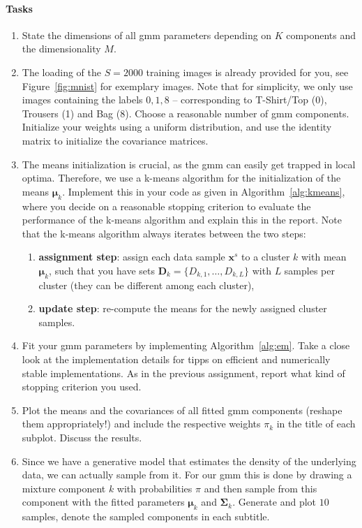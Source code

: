 \documentclass{article}
\newcommand{\sig}{\boldsymbol{\Sigma}}
\newcommand{\m}{\boldsymbol{\mu}}
\renewcommand{\vec}[1]{\textbf{#1}}
\renewcommand{\vec}[1]{\textbf{#1}}
\begin{document}
\paragraph{Tasks}
\begin{enumerate}
	\item State the dimensions of all \gls{gmm} parameters depending on $K$ components and the dimensionality $M$. 
	\item The loading of the $S=2000$ training images is already provided for you, see Figure~\ref{fig:mnist} for exemplary images. Note that for simplicity, we only use images containing the labels $0,1,8$ -- corresponding to T-Shirt/Top (0), Trousers (1) and Bag (8). Choose a reasonable number of \gls{gmm} components.
	Initialize your weights using a uniform distribution, and use the identity matrix to initialize the covariance matrices.
	\item The means initialization is crucial, as the \gls{gmm} can easily get trapped in local optima. Therefore, we use a k-means algorithm for the initialization of the means $\m_k$. Implement this in your code as given in Algorithm~\ref{alg:kmeans}, where you decide on a reasonable stopping criterion to evaluate the performance of the k-means algorithm and explain this in the report. Note that the k-means algorithm always iterates between the two steps:
	\begin{enumerate}
	\item \textbf{assignment step}: assign each data sample $\vec x^s$ to a cluster $k$ with mean $\m_k$, such that you have sets $\vec D_k = \{ D_{k,1}, \dots, D_{k,L} \}$ with $L$ samples per cluster (they can be different among each cluster),
	\item \textbf{update step}: re-compute the means for the newly assigned cluster samples.
	\end{enumerate}
	\item Fit your \gls{gmm} parameters by implementing Algorithm~\ref{alg:em}. Take a close look at the implementation details for tipps on efficient and numerically stable implementations. As in the previous assignment, report what kind of stopping criterion you used. 
	\item Plot the means and the covariances of all fitted \gls{gmm} components (reshape them appropriately!) and include the respective weights $\pi_k$ in the title of each subplot. Discuss the results. 
	\item Since we have a generative model that estimates the density of the underlying data, we can actually sample from it. For our \gls{gmm} this is done by drawing a mixture component $k$ with probabilities $\pi$ and then sample from this component with the fitted parameters $\m_k$ and $\sig_k$. Generate and plot $10$ samples, denote the sampled components in each subtitle.
\end{enumerate}
\end{document}
